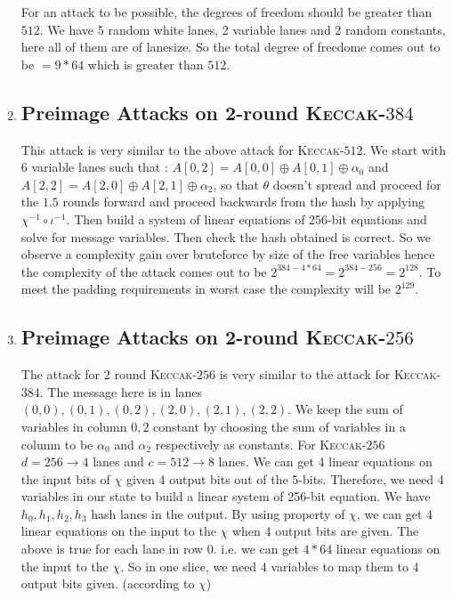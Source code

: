 \documentclass[runningheads]{llncs}
\newcommand{\KECCAK}{\mbox{\textsc{Keccak}}}
\begin{document}
\begin{enumerate}
		For an attack to be possible, the degrees of freedom should be greater than $512$. We have 5 random white lanes, 2 variable lanes and 2 random constants, here all of them are of lanesize. So the total degree of freedome comes out to be $= 9 * 64$ which is greater than $512$. 

	\item \subsection{Preimage Attacks on 2-round \KECCAK-$384$}
				This attack is very similar to the above attack for \KECCAK-$512$. We start with 6 variable lanes such that :
				$A[0, 2] = A[0, 0] \oplus A[0, 1] \oplus \alpha_0$ and $A[2, 2] = A[2, 0] \oplus A[2, 1] \oplus \alpha_2$, so that $\theta$ doesn't spread and proceed for the $1.5$ rounds forward and proceed backwards from the hash by applying $\chi^{-1} \circ \iota^{-1}$. Then build a system of linear equations of 256-bit equations and solve for message variables. Then check the hash obtained is correct. So we observe a complexity gain over bruteforce by size of the free variables hence the complexity of the attack comes out to be $2^{384 - 4*64} = 2^{384 - 256} = 2^{128}$. To meet the padding requirements in worst case the complexity will be $2^{129}$.

	\item \subsection{Preimage Attacks on 2-round \KECCAK-$256$}
			The attack for 2 round \KECCAK-$256$ is very similar to the attack for \KECCAK-$384$.
			The message here is in lanes $(0, 0), (0, 1), (0, 2), (2, 0), (2, 1), (2, 2)$.
    	We keep the sum of variables in column $0, 2$ constant by choosing the sum of variables in a column to be $\alpha_0 $ and $\alpha_2$ respectively as constants. For \KECCAK-$256$ $d = 256 \rightarrow 4$ lanes and $c = 512 \rightarrow 8$ lanes. We can get 4 linear equations on the input bits of $\chi$ given 4 output bits out of the 5-bits. Therefore, we need 4 variables in our state to build a linear system of 256-bit equation.	We have $h_0, h_1, h_2, h_3$  hash lanes in the output. By using property of $\chi$, we can get 4 linear equations on the input to the $\chi$ when 4 output bits are given. The above is true for each lane in row 0. i.e. we can get $4*64$ linear equations on the input to the $\chi$. So in one slice, we need 4 variables to map them to 4 output bits given. (according to $\chi$) 
			

\end{enumerate}
\end{document}
